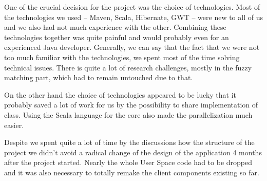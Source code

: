 One of the crucial decision for the project was the choice of technologies. Most of the technologies we used -- Maven, Scala, Hibernate, GWT -- were new to all of us and we also had not much experience with the other. Combining these technologies together was quite painful and would probably even for an experienced Java developer. Generally, we can say that the fact that we were not too much familiar with the technologies, we spent most of the time solving technical issues. There is quite a lot of research challenges, mostly in the fuzzy matching part, which had to remain untouched due to that.

On the other hand the choice of technologies appeared to be lucky that it probably saved a lot of work for us by the possibility to share implementation of class. Using the Scala language for the core also made the parallelization much easier.

Despite we spent quite a lot of time by the discussions how the structure of the project we didn't avoid a radical change of the design of the application 4 months after the project started. Nearly the whole User Space code had to be dropped and it was also necessary to totally remake the client components existing so far.





